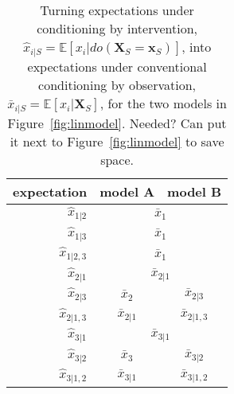 \documentclass{article}
\newcommand{\vX}{\mathbf{X}}
\newcommand{\vx}{\mathbf{x}}
\newcommand{\expectation}{\mathbb{E}}
\newcommand{\dodo}{\mathit{do}}
\newcommand{\lvdo}[1]{\dodo(\vX_{#1} = \vx_{#1})}
\newcommand{\bx}{\bar{x}}
\newcommand{\hx}{\hat{x}}
\newcommand{\comment}[1]{{\color{red} #1}}
\begin{document}
\begin{table}
	\begin{center}
		\begin{tabular}{r|cc} \toprule
			expectation & model A & model B \\ \midrule
			$\hx_{1|2}$ & \multicolumn{2}{c}{$\bx_1$} \\
			$\hx_{1|3}$ & \multicolumn{2}{c}{$\bx_1$} \\
			$\hx_{1|2,3}$ & \multicolumn{2}{c}{$\bx_1$} \\ \midrule
			$\hx_{2|1}$ & \multicolumn{2}{c}{$\bx_{2|1}$} \\
			$\hx_{2|3}$ & $\bx_{2}$ & $\bx_{2|3}$ \\
			$\hx_{2|1,3}$ & $\bx_{2|1}$ & $\bx_{2|1,3}$ \\ \midrule
			$\hx_{3|1}$ & \multicolumn{2}{c}{$\bx_{3|1}$} \\
			$\hx_{3|2}$ & $\bx_{3}$ & $\bx_{3|2}$ \\
			$\hx_{3|1,2}$ & $\bx_{3|1}$ & $\bx_{3|1,2}$ \\ \bottomrule
		\end{tabular}
	\end{center}
	\caption{Turning expectations under conditioning by intervention, $\hx_{i|S} = \expectation[x_i|\lvdo{S}]$, into expectations under conventional conditioning by observation, $\bx_{i|S} = \expectation[x_i|\vX_S]$, for the two models in Figure~\ref{fig:linmodel}. \comment{Needed? Can put it next to Figure~\ref{fig:linmodel} to save space.}}
	\label{tab:rewriting}
\end{table}
\end{document}
